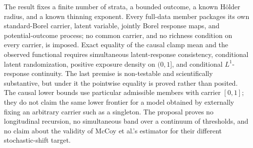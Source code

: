 The result fixes a finite number of strata, a bounded outcome, a known Hölder radius, and a known thinning exponent. Every full-data member packages its own standard-Borel carrier, latent variable, jointly Borel response maps, and potential-outcome process; no common carrier, and no richness condition on every carrier, is imposed. Exact equality of the causal clamp mean and the observed functional requires simultaneous latent-response consistency, conditional latent randomization, positive exposure density on \((0,1]\), and conditional \(L^1\)-response continuity. The last premise is non-testable and scientifically substantive, but under it the pointwise equality is proved rather than posited. The causal lower bounds use particular admissible members with carrier \([0,1]\); they do not claim the same lower frontier for a model obtained by externally fixing an arbitrary carrier such as a singleton. The proposal proves no longitudinal recursion, no simultaneous band over a continuum of thresholds, and no claim about the validity of McCoy et al.'s estimator for their different stochastic-shift target.